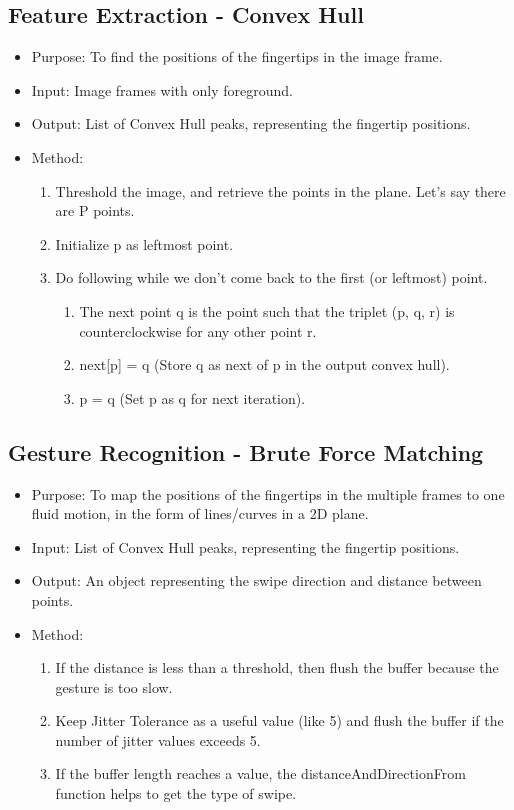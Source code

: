 \documentclass[11pt]{report}
\begin{document}
\subsection{Feature Extraction - Convex Hull}
\begin{itemize}
    \item Purpose: To find the positions of the fingertips in the image frame.
    \item Input: Image frames with only foreground.
    \item Output: List of Convex Hull peaks, representing the fingertip positions.
    \item Method:
    \begin{enumerate}
        \item Threshold the image, and retrieve the points in the plane. Let's say there are P points.
        \item Initialize p as leftmost point.
        \item Do following while we don’t come back to the first (or leftmost) point.
        \begin{enumerate}
            \item The next point q is the point such that the triplet (p, q, r) is counterclockwise for any other point r.
            \item next[p] = q (Store q as next of p in the output convex hull).
            \item p = q (Set p as q for next iteration).
        \end{enumerate}
        
    \end{enumerate}
\end{itemize}
\subsection{Gesture Recognition - Brute Force Matching}
\begin{itemize}
    \item Purpose: To map the positions of the fingertips in the multiple frames to one fluid motion, in the form of lines/curves in a 2D plane.
    \item Input: List of Convex Hull peaks, representing the fingertip positions.
    \item Output: An object representing the swipe direction and distance between points. 
    \item Method:
    \begin{enumerate}
        \item If the distance is less than a threshold, then flush the buffer because the gesture is too slow.
        \item Keep Jitter Tolerance as a useful value (like 5) and flush the buffer if the number of jitter values exceeds 5.
        \item If the buffer length reaches a value, the distanceAndDirectionFrom function helps to get the type of swipe.
    \end{enumerate}
\end{itemize}
\end{document}
